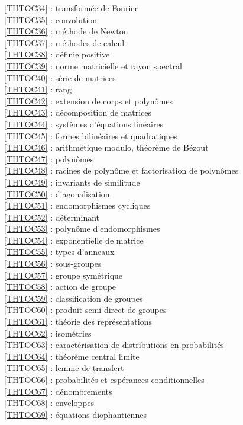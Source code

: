 \ref {THTOC34} : transformée de Fourier\\
\ref {THTOC35} : convolution\\
\ref {THTOC36} : méthode de Newton\\
\ref {THTOC37} : méthodes de calcul\\
\ref {THTOC38} : définie positive\\
\ref {THTOC39} : norme matricielle et rayon spectral\\
\ref {THTOC40} : série de matrices\\
\ref {THTOC41} : rang\\
\ref {THTOC42} : extension de corps et polynômes\\
\ref {THTOC43} : décomposition de matrices\\
\ref {THTOC44} : systèmes d'équations linéaires\\
\ref {THTOC45} : formes bilinéaires et quadratiques\\
\ref {THTOC46} : arithmétique modulo, théorème de Bézout\\
\ref {THTOC47} : polynômes\\
\ref {THTOC48} : racines de polynôme et factorisation de polynômes\\
\ref {THTOC49} : invariants de similitude\\
\ref {THTOC50} : diagonalisation\\
\ref {THTOC51} : endomorphismes cycliques\\
\ref {THTOC52} : déterminant\\
\ref {THTOC53} : polynôme d'endomorphismes\\
\ref {THTOC54} : exponentielle de matrice\\
\ref {THTOC55} : types d'anneaux\\
\ref {THTOC56} : sous-groupes\\
\ref {THTOC57} : groupe symétrique\\
\ref {THTOC58} : action de groupe\\
\ref {THTOC59} : classification de groupes\\
\ref {THTOC60} : produit semi-direct de groupes\\
\ref {THTOC61} : théorie des représentations\\
\ref {THTOC62} : isométries\\
\ref {THTOC63} : caractérisation de distributions en probabilités\\
\ref {THTOC64} : théorème central limite\\
\ref {THTOC65} : lemme de transfert\\
\ref {THTOC66} : probabilités et espérances conditionnelles\\
\ref {THTOC67} : dénombrements\\
\ref {THTOC68} : enveloppes\\
\ref {THTOC69} : équations diophantiennes\\
